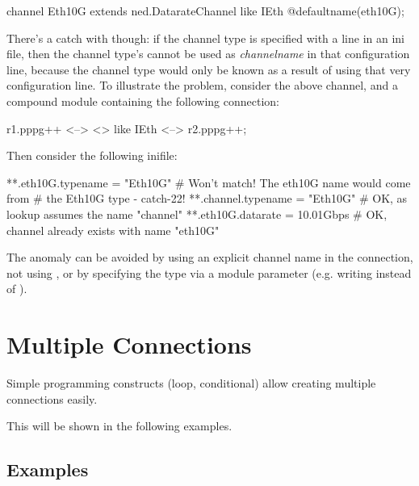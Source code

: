 \begin{ned}
channel Eth10G extends ned.DatarateChannel like IEth {
    @defaultname(eth10G);
}
\end{ned}

There's a catch with  though: if the channel type is
specified with a  line in an ini file, then
the channel type's  cannot be used as \textit{channelname}
in that configuration line, because the channel type would only be known as a
result of using that very configuration line. To illustrate the problem,
consider the above  channel, and a compound module containing the
following connection:

\begin{ned}
r1.pppg++ <--> <> like IEth <--> r2.pppg++;
\end{ned}

Then consider the following inifile:

\begin{inifile}
**.eth10G.typename = "Eth10G"   # Won't match! The eth10G name would come from
                                #   the Eth10G type - catch-22!
**.channel.typename = "Eth10G"  # OK, as lookup assumes the name "channel"
**.eth10G.datarate = 10.01Gbps  # OK, channel already exists with name "eth10G"
\end{inifile}

The anomaly can be avoided by using an explicit channel name in the connection,
not using , or by specifying the type via a module parameter
(e.g. writing  instead of ).



\section{Multiple Connections}
\label{sec:ned-lang:multiple-connections}

Simple programming constructs (loop, conditional) allow creating
multiple connections easily.


This will be shown in the following examples.

\subsection{Examples}
\label{sec:ned-lang:multiple-connections-examples}

